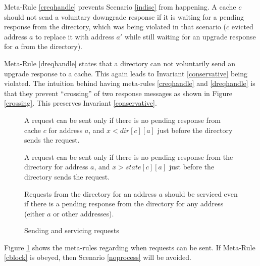 Meta-Rule \ref{creqhandle} prevents Scenario \ref{indisc} from happening. A
cache $c$ should not send a voluntary downgrade response  if
it is waiting for a pending response from the directory, which was being
violated in that scenario ($c$ evicted address $a$ to replace it with address
$a'$ while still waiting for an upgrade response for $a$ from the directory).

Meta-Rule \ref{dreqhandle} states that a directory can not voluntarily send an
upgrade response to a cache. This again leads to Invariant \ref{conservative}
being violated. The intuition behind having meta-rules \ref{creqhandle} and
\ref{dreqhandle} is that they prevent ``crossing'' of two response messages as
shown in Figure \ref{crossing}. This preserves Invariant \ref{conservative}.

\begin{figure}
\begin{cons}
A request  can be sent only if there is no pending response
from cache $c$ for address $a$, and $x < dir[c][a]$ just before the directory
sends the request.
\label{dirreq}
\end{cons}
\begin{cons}
A request  can be sent only if there is no pending response
from the directory for address $a$, and $x > state[c][a]$ just before the
directory sends the request.
\label{creq}
\end{cons}
\begin{cons}
Requests from the directory for an address $a$ should be serviced even if there
is a pending response from the directory for any address (either $a$ or other
addresses).
\label{cblock}
\end{cons}
\caption{Sending and servicing requests}
\label{sendReqPre}
\end{figure}

Figure \ref{sendReqPre} shows the meta-rules regarding when requests can be
sent. If Meta-Rule \ref{cblock} is obeyed, then Scenario \ref{noprocess} will
be avoided.
